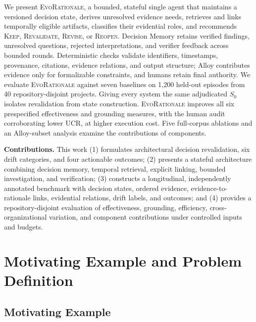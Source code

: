 \documentclass[10pt,conference]{IEEEtran}
\begin{document}
We present \textsc{EvoRationale}, a bounded, stateful single agent that maintains a versioned decision state, derives unresolved evidence needs, retrieves and links temporally eligible artifacts, classifies their evidential roles, and recommends \textsc{Keep}, \textsc{Revalidate}, \textsc{Revise}, or \textsc{Reopen}. Decision Memory retains verified findings, unresolved questions, rejected interpretations, and verifier feedback across bounded rounds. Deterministic checks validate identifiers, timestamps, provenance, citations, evidence relations, and output structure; Alloy contributes evidence only for formalizable constraints, and humans retain final authority. We evaluate \textsc{EvoRationale} against seven baselines on 1,200 held-out episodes from 40 repository-disjoint projects. Giving every system the same adjudicated $S_0$ isolates revalidation from state construction. \textsc{EvoRationale} improves all six prespecified effectiveness and grounding measures, with the human audit corroborating lower UCR, at higher execution cost. Five full-corpus ablations and an Alloy-subset analysis examine the contributions of components.

\noindent\textbf{Contributions.} This work (1) formulates architectural decision revalidation, six drift categories, and four actionable outcomes; (2) presents a stateful architecture combining decision memory, temporal retrieval, explicit linking, bounded investigation, and verification; (3) constructs a longitudinal, independently annotated benchmark with decision states, ordered evidence, evidence-to-rationale links, evidential relations, drift labels, and outcomes; and (4) provides a repository-disjoint evaluation of effectiveness, grounding, efficiency, cross-organizational variation, and component contributions under controlled inputs and budgets.
\section{Motivating Example and Problem Definition}
\label{sec:motivation-problem}

\subsection{Motivating Example}
\label{sec:motivating-example}
\end{document}

